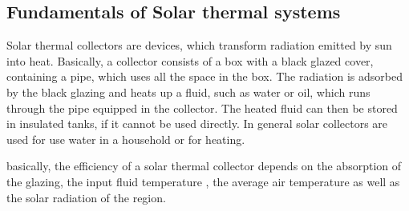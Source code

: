 \subsection{Fundamentals of Solar thermal systems}

Solar thermal collectors are devices, which transform radiation emitted by sun into heat. Basically, a collector consists of a box with a black glazed cover, containing a pipe, which uses all the space in the box. The radiation is adsorbed by the black glazing and heats up a fluid, such as water or oil, which runs through the pipe equipped in the  collector. The heated fluid can then be stored in insulated tanks, if it cannot be used directly.    In general solar collectors are used for use water in a household or for heating.

basically, the efficiency of a solar thermal collector depends on the absorption of the glazing, the input fluid temperature , the average air temperature as well as the solar radiation of the region.